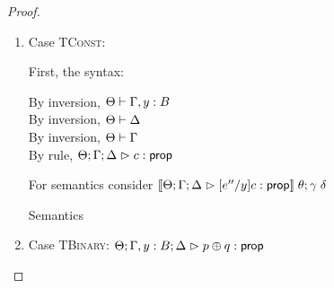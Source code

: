 \begin{proof}
\begin{enumerate}
  For semantics, consider $\interp{\judgeA[\Theta; \Gamma; \Delta]{[e''/y](p\;[\tau'])}{\upsilon}}\;\theta\;\gamma\;\delta$
  \begin{eqnproof}
    {Semantics}
    {Induction}
          {Semantics}
  \end{eqnproof}


\item Case \textsc{TConst}:

  First, the syntax: 
  \begin{tabbedproof}
    \oo By inversion, $\judgectx{\Theta}{\Gamma, y:B}$ \\
    \oo By inversion, $\judgectx{\Theta}{\Delta}$ \\
    \oo By inversion, $\judgectx{\Theta}{\Gamma}$ \\
    \oo By rule, $\judgeA[\Theta; \Gamma; \Delta]{c}{\assert}$
  \end{tabbedproof}

  For semantics consider $\interp{\judgeA[\Theta; \Gamma; \Delta]{[e''/y]c}{\assert}}\;\theta;\gamma\;\delta$ 
  \begin{eqnproof}
          {Semantics}
  \end{eqnproof}

\item Case \textsc{TBinary}: $\judgeA[\Theta; \Gamma, y:B; \Delta]{p \oplus q}{\assert}$
  

\end{enumerate}
\end{proof}
